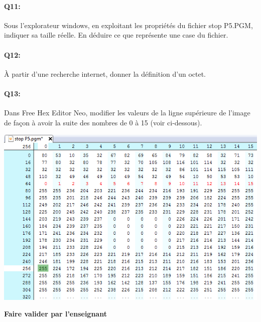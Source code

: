 \documentclass{article}
\begin{document}
\paragraph{Q11:}
Sous l'explorateur windows, en exploitant les propriétés du fichier \og{}stop P5.PGM\fg{}, indiquer sa taille réelle. 
En déduire ce que représente une case du fichier.

\vspace{1em}
\begin{Form}
	\TextField[name=r11,width=\linewidth,height=5em,multiline=true]{}
\end{Form}

\newpage

\paragraph{Q12:}
À partir d'une recherche internet, donner la définition d'un octet.

\vspace{1em}
\begin{Form}
	\TextField[name=r12,width=\linewidth,height=5em,multiline=true]{}
\end{Form}

\paragraph{Q13:}
Dans \og{}Free Hex Editor Neo\fg{}, modifier les valeurs de la ligne supérieure de l'image de façon à avoir la suite des nombres de 0 à 15 (voir ci-dessous).

\begin{center}
	\includegraphics[width=.8\linewidth]{./figures/hex_0to15.png}
\end{center}

\begin{center}
	\Large
	\textbf{Faire valider par l'enseignant}
\end{center}
\end{document}

